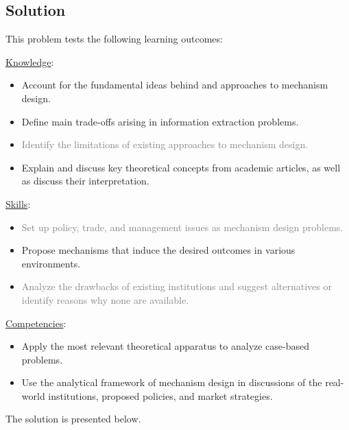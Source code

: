 \documentclass[a4paper]{article}
\begin{document}
	\subsection*{Solution}
	This problem tests the following learning outcomes:
	\begin{framed}
		\underline{Knowledge}:
		\begin{itemize}[$\circ$]
			\item {Account for the fundamental ideas behind and approaches to mechanism design.}
			\item {Define main trade-offs arising in information extraction problems.}
			\item \textcolor{gray}{Identify the limitations of existing approaches to mechanism design.}
			\item {Explain and discuss key theoretical concepts from academic articles, as well as discuss their interpretation.}
		\end{itemize}
		\underline{Skills}:
		\begin{itemize}[$\circ$]
			\item \textcolor{gray}{Set up policy, trade, and management issues as mechanism design problems.}
			\item {Propose mechanisms that induce the desired outcomes in various environments.}
			\item \textcolor{gray}{Analyze the drawbacks of existing institutions and suggest alternatives or identify reasons why none are available.}
		\end{itemize}
		\underline{Competencies}:
		\begin{itemize}[$\circ$]
			\item {Apply the most relevant theoretical apparatus to analyze case-based problems.}
			\item {Use the analytical framework of mechanism design in discussions of the real-world institutions, proposed policies, and market strategies.}
		\end{itemize}
	\end{framed}
	
	The solution is presented below.
	
\end{document}
